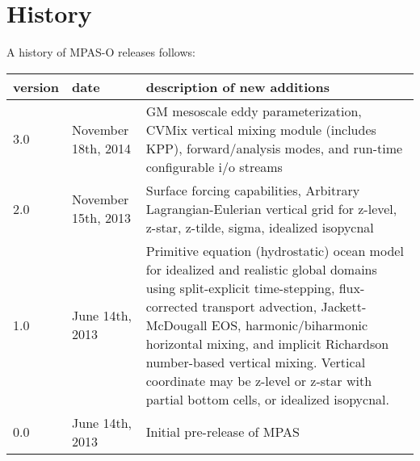 \chapter*{History}
\label{chap:history}

A history of MPAS-O releases follows: \\


\begin{tabular}{ll p{4in}} 
\hline\hline version & date & description of new additions  \\
\hline 
3.0 & November 18th, 2014 & 
GM mesoscale eddy parameterization, CVMix vertical mixing module (includes KPP), forward/analysis modes, and run-time configurable i/o streams \\
\hline 
2.0 & November 15th, 2013 & 
Surface forcing capabilities, Arbitrary Lagrangian-Eulerian vertical grid for z-level, z-star, z-tilde, sigma, idealized isopycnal \\
\hline 
1.0 & June 14th, 2013 & Primitive equation (hydrostatic) ocean model for idealized and realistic global domains using split-explicit time-stepping, flux-corrected transport advection, Jackett-McDougall EOS, harmonic/biharmonic horizontal mixing, and implicit Richardson number-based vertical mixing.  Vertical coordinate may be z-level or z-star with partial bottom cells, or idealized isopycnal. \\
\hline 
0.0 & June 14th, 2013 & Initial pre-release of MPAS \\
\hline 
\end{tabular} 



\newpage
